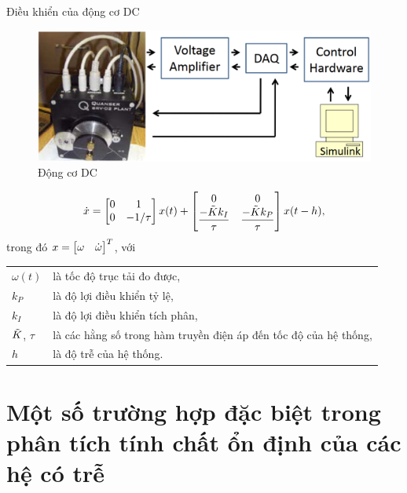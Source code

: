 \documentclass[10pt]{beamer}
\begin{document}
    \small{
	\begin{frame}{Điều khiển của động cơ DC}
		    \begin{figure}[h!]
				\centering
				\includegraphics[scale= 0.25]{"./Hinh/DCmotor"}
				\caption[Động cơ DC]{Động cơ DC}
				\label{fig:DCmotor}
			\end{figure}
			  \begin{equation*}\label{dc}
				\dot{x} = 
				\begin{bmatrix} 0 & 1 \\ 0 & -1/\tau \end{bmatrix} x(t)
				+ 
				\begin{bmatrix} 0 & 0 \\ \dfrac{-\tilde{K} k_I}{\tau} & \dfrac{-\tilde{K} k_P}{\tau} \end{bmatrix} x(t-h),
			\end{equation*}
		trong đó $x = \begin{bmatrix} \omega & \dot{\omega} \end{bmatrix}^T$, với \\
		\begin{tabular}{ll}
				$\omega(t)$   &   là tốc độ trục tải đo được,  \\
				$k_P$          &   là độ lợi điều khiển tỷ lệ,  \\
				$k_I$       &   là độ lợi điều khiển tích phân, \\
				$\tilde{K}$, $\tau$ &   là các hằng số trong hàm truyền điện áp đến tốc độ của hệ thống, \\
				$h$         & là độ trễ của hệ thống.
			\end{tabular} 
	 \end{frame}
	}

	\section{Một số trường hợp đặc biệt trong phân tích tính chất \linebreak ổn định của các hệ có trễ}
	
\end{document}
